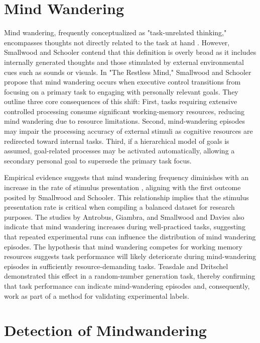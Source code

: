 
\section{Mind Wandering}
\label{sec: mind_wandering}
Mind wandering, frequently conceptualized as "task-unrelated thinking," encompasses thoughts not directly related to the task at hand \cite{Barron2011} \cite{McVay2009}. However, Smallwood and Schooler\cite{SmallwoodSchooler2015} contend that this definition is overly broad as it includes internally generated thoughts and those stimulated by external environmental cues such as sounds or visuals. In "The Restless Mind," Smallwood and Schooler propose that mind wandering occurs when executive control transitions from focusing on a primary task to engaging with personally relevant goals. They outline three core consequences of this shift: First, tasks requiring extensive controlled processing consume significant working-memory resources, reducing mind wandering due to resource limitations. Second, mind-wandering episodes may impair the processing accuracy of external stimuli as cognitive resources are redirected toward internal tasks. Third, if a hierarchical model of goals is assumed, goal-related processes may be activated automatically, allowing a secondary personal goal to supersede the primary task focus.

Empirical evidence suggests that mind wandering frequency diminishes with an increase in the rate of stimulus presentation \cite{Antrobus1968} \cite{Giambra1995} \cite{Smallwood2004}, aligning with the first outcome posited by Smallwood and Schooler. This relationship implies that the stimulus presentation rate is critical when compiling a balanced dataset for research purposes. The studies by Antrobus\cite{Antrobus1968}, Giambra\cite{Giambra1995}, and Smallwood and Davies\cite{Smallwood2004} also indicate that mind wandering increases during well-practiced tasks, suggesting that repeated experimental runs can influence the distribution of mind wandering episodes. The hypothesis that mind wandering competes for working memory resources suggests task performance will likely deteriorate during mind-wandering episodes in sufficiently resource-demanding tasks. Teasdale and Dritschel\cite{Teasdale1995} demonstrated this effect in a random-number generation task, thereby confirming that task performance can indicate mind-wandering episodes and, consequently, work as part of a method for validating experimental labels.

\section{Detection of Mindwandering}

